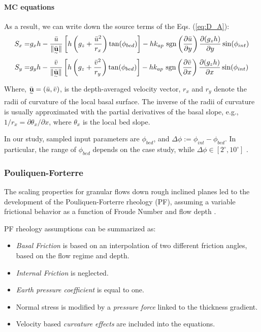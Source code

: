 \documentclass{article}
\begin{document}
\paragraph{MC equations} As a result, we can write down the source terms of the Eqs. (\ref{eq:D_A}):
\begin{eqnarray}\label{S_terms_MC}
S_x =& g_x h  - \frac{\bar{u}}{\| \underset{^\sim}{\bar{\textbf u}} \|} \left[h\left(g_z+\frac{\bar{u}^2}{r_x}\right)\tan(\phi_{bed})\right] - h k_{ap} \ {\rm sgn}\left(\frac{\partial \bar{u}}{\partial y}\right) \frac{\partial (g_z h)}{\partial y} \sin(\phi_{int}) \nonumber \\
 S_y =& g_y h  - \frac{\bar{v}}{\| \underset{^\sim}{\bar{\textbf u}} \|} \left[h\left(g_z +\frac{\bar{v}^2}{r_y}\right)\tan(\phi_{bed})\right] - h k_{ap} \ {\rm sgn}\left({\frac{\partial \bar{v}}{\partial x}}\right) \frac{\partial (g_z h)}{\partial x} \sin(\phi_{int})
\end{eqnarray}
Where, $\underset{^\sim}{\bar{\textbf u}} = (\bar{u} , \bar{v})$, is the depth-averaged velocity vector, $r_x$ and $r_y$ denote the radii of curvature
of the local basal surface. The inverse of the radii of curvature is usually approximated with the partial derivatives of the basal slope, e.g., $1/r_x = \partial \theta_x/\partial x$, where $\theta_x$ is the local bed slope.

In our study, sampled input parameters are $\phi_{bed}$, and $\Delta \phi:=\phi_{int}-\phi_{bed}$. In particular, the range of $\phi_{bed}$ depends on the case study, while $\Delta \phi \in [2^{\mathrm{\circ}}, 10^{\mathrm{\circ}}]$ \citep{Dalbey2008}.

\subsubsection{Pouliquen-Forterre}\label{PFM}
The scaling properties for granular flows down rough inclined planes led to the development of the Pouliquen-Forterre rheology (PF), assuming a variable frictional behavior as a function of Froude Number and flow depth \citep{Pouliquen1999, ForterrePouliquen2002, PouliquenForterre2002, ForterrePouliquen2003}.

PF rheology assumptions can be summarized as:
\begin{itemize}
\item \textit{Basal Friction} is based on an interpolation of two different friction angles, based on the flow regime and depth.

\item \textit{Internal Friction} is neglected.

\item \textit{Earth pressure coefficient} is equal to one.

\item Normal stress is modified by a \textit{pressure force} linked to the thickness gradient.

\item Velocity based \textit{curvature effects} are included into the equations.
\end{itemize}
\end{document}
